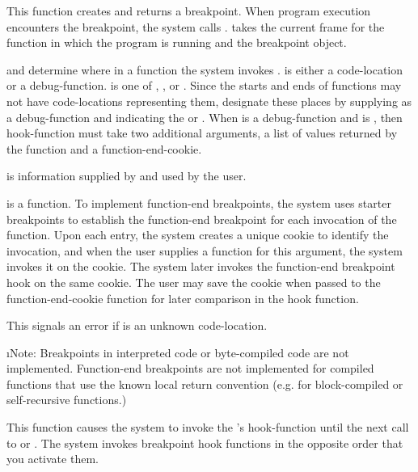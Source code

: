 {
This function creates and returns a breakpoint.  When program execution
encounters the breakpoint, the system calls .
 takes the current frame for the function in which the
program is running and the breakpoint object.

 and  determine where in a function the system invokes
.   is either a code-location or a
debug-function.   is one of , 
, or .  Since the starts and ends of
functions may not have code-locations representing them, designate these places
by supplying  as a debug-function and  indicating the
 or .  When  is a
debug-function and  is , then hook-function must
take two additional arguments, a list of values returned by the function and a
function-end-cookie.

 is information supplied by and used by the user.

 is a function.  To implement function-end
breakpoints, the system uses starter breakpoints to establish the function-end
breakpoint for each invocation of the function.  Upon each entry, the system
creates a unique cookie to identify the invocation, and when the user supplies
a function for this argument, the system invokes it on the cookie.  The system
later invokes the function-end breakpoint hook on the same cookie.  The user
may save the cookie when passed to the function-end-cookie function for
later comparison in the hook function.

This signals an error if  is an unknown code-location.

\i{Note: Breakpoints in interpreted code or byte-compiled code are not
implemented.  Function-end breakpoints are not implemented for compiled
functions that use the known local return convention (e.g. for block-compiled
or self-recursive functions.)}

\enddefun


This function causes the system to invoke the 's hook-function
until the next call to  or .
The system invokes breakpoint hook functions in the opposite order that you
activate them.
\enddefun


}
